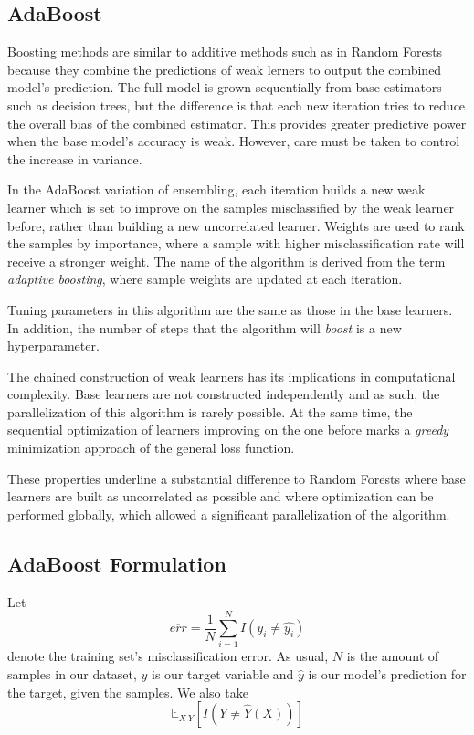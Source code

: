 \documentclass{article}%
\newcommand{\Expect}{{\mathbb{E}}}
\theoremstyle{definition}
\begin{document}
\subsection{AdaBoost}
\cite{schapire-adaBoost}

Boosting methods are similar to additive methods such as in Random Forests because they combine the predictions of weak lerners to output the combined model's prediction. The full model is grown sequentially from base estimators such as decision trees, but the difference is that each new iteration tries to reduce the overall bias of the combined estimator. This provides greater predictive power when the base model's accuracy is weak. However, care must be taken to control the increase in variance.

In the AdaBoost variation of ensembling, each iteration builds a new weak learner which is set to improve on the samples misclassified by the weak learner before, rather than building a new uncorrelated learner. Weights are used to rank the samples by importance, where a sample with higher misclassification rate will receive a stronger weight. The name of the algorithm is derived from the term \textit{adaptive boosting}, where sample weights are updated at each iteration.

Tuning parameters in this algorithm are the same as those in the base learners. In addition, the number of steps that the algorithm will \textit{boost} is a new hyperparameter. 

The chained construction of weak learners has its implications in computational complexity. Base learners are not constructed independently and as such, the parallelization of this algorithm is rarely possible. At the same time, the sequential optimization of learners improving on the one before marks a \textit{greedy} minimization approach of the general loss function.

These properties underline a substantial difference to Random Forests where base learners are built as uncorrelated as possible and where optimization can be performed globally, which allowed a significant parallelization of the algorithm. 

\subsection{AdaBoost Formulation}

Let 
\begin{equation} \label{equation-adaBoostTrainingError}
	\overline{err} = \frac{1}{N} \sum_{i=1}^{N} I(y_i \neq \hat{y_i})
\end{equation}
denote the training set's misclassification error. As usual, $N$ is the amount of samples in our dataset, $y$ is our target variable and $\hat{y}$ is our model's prediction for the target, given the samples. We also take 
$$\Expect_{X \ Y} [ I(Y \neq \hat{Y}(X)) ]$$ 
\end{document}
